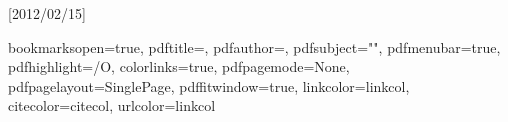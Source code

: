 


\newcommand{\refname}{{\sffamily References}}
\usepackage{aecompl}


\usepackage[intoc]{nomencl}
\renewcommand{\nomname}{Notations and Acronyms}
\nomlabelwidth=25mm


 \makenomenclature
 \renewcommand{\nomgroup}[1]{%
\ifthenelse{\equal{#1}{N}}{\item[\Large\sffamily\textbf{Notations}]}{%
\ifthenelse{\equal{#1}{X}}{\item[\Large\sffamily\textbf{Acronyms}]}{}}}

\usepackage{makeidx}
 \makeindex


\makenomenclature



\usepackage{ifpdf}

\ifpdf
  \usepackage{graphicx}
  \usepackage[pagebackref,hyperindex=true]{hyperref}
\else
  \usepackage{graphicx}
  \usepackage[dvipdfm,pagebackref,hyperindex=true]{hyperref}
\fi

\usepackage{cleveref}[2012/02/15]%



\graphicspath{{.}{imgs/}}

\renewcommand*{\backref}[1]{}
\renewcommand*{\backrefalt}[4]{%
\ifcase #1 %
(Not cited)%
\or
(Cited on page~#2.)%
\else
(Cited on pages~#2.)%
\fi}
\renewcommand*{\backrefsep}{, }
\renewcommand*{\backreftwosep}{ and~}
\renewcommand*{\backreflastsep}{ and~}

\usepackage{color}


\hypersetup
{
bookmarksopen=true,
pdftitle=\mytitle,
pdfauthor=\myauthor, %
pdfsubject="", %
pdfmenubar=true, %
pdfhighlight=/O, %
colorlinks=true, %
pdfpagemode=None, %
pdfpagelayout=SinglePage, %
pdffitwindow=true, %
linkcolor=linkcol, %
citecolor=citecol, %
urlcolor=linkcol %
}

